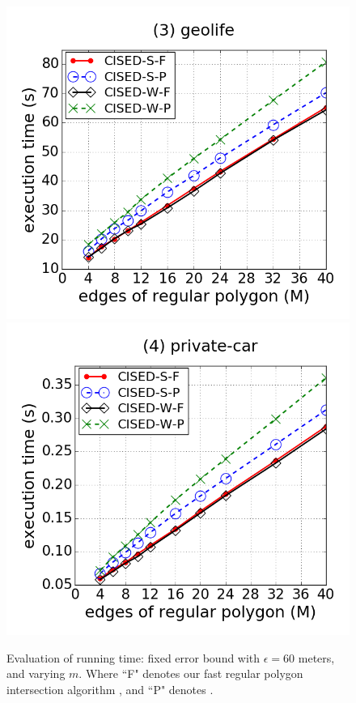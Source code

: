 \begin{figure}[tb!]
\includegraphics[scale = 0.250]{figures/Exp-M-e-60-time-geolife.png}
\includegraphics[scale = 0.250]{figures/Exp-M-e-60-time-private.png}
\vspace{-2ex}
\caption{\small Evaluation of running time: fixed error bound with $\epsilon=60$ meters, and varying $m$. Where ``F" denotes our fast regular polygon intersection algorithm \rpia, and ``P" denotes \cpia.}
\label{fig:m-time-e60}
\vspace{-2ex}
\end{figure}

